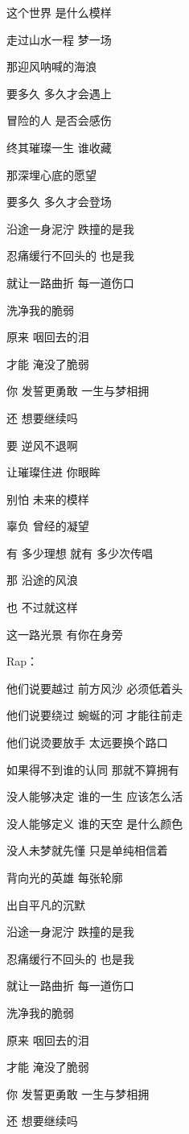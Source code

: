 \documentclass[]{ctexbook}
\begin{document}
这个世界 是什么模样

走过山水一程 梦一场

那迎风呐喊的海浪

要多久 多久才会遇上

冒险的人 是否会感伤

终其璀璨一生 谁收藏

那深埋心底的愿望

要多久 多久才会登场

沿途一身泥泞 跌撞的是我

忍痛缓行不回头的 也是我

就让一路曲折 每一道伤口

洗净我的脆弱

原来 咽回去的泪

才能 淹没了脆弱

你 发誓更勇敢 一生与梦相拥

还 想要继续吗

要 逆风不退啊

让璀璨住进 你眼眸

别怕 未来的模样

辜负 曾经的凝望

有 多少理想 就有 多少次传唱

那 沿途的风浪

也 不过就这样

这一路光景 有你在身旁

Rap：

他们说要越过 前方风沙 必须低着头

他们说要绕过 蜿蜒的河 才能往前走

他们说烫要放手 太远要换个路口

如果得不到谁的认同 那就不算拥有

没人能够决定 谁的一生 应该怎么活

没人能够定义 谁的天空 是什么颜色

没人未梦就先懂 只是单纯相信着

背向光的英雄 每张轮廓

出自平凡的沉默

沿途一身泥泞 跌撞的是我

忍痛缓行不回头的 也是我

就让一路曲折 每一道伤口

洗净我的脆弱

原来 咽回去的泪

才能 淹没了脆弱

你 发誓更勇敢 一生与梦相拥

还 想要继续吗
\end{document}
